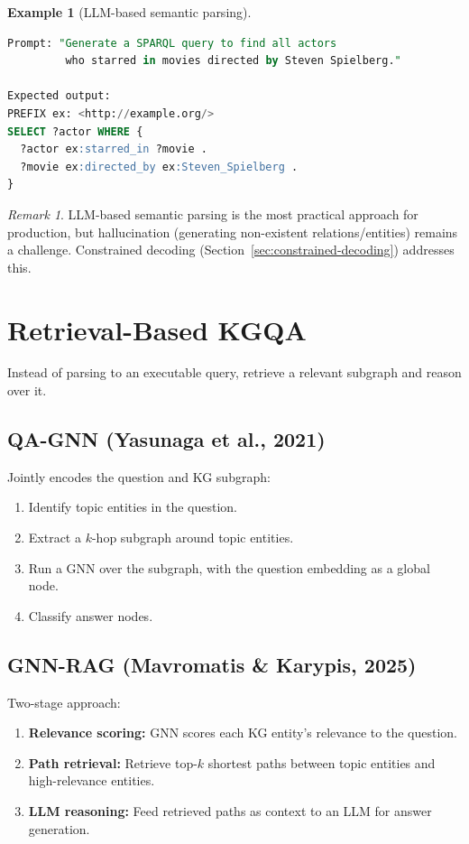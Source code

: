 \documentclass[11pt,a4paper,oneside,openany]{book}
\theoremstyle{definition}
\newtheorem{example}{Example}[chapter]
\theoremstyle{plain}
\theoremstyle{remark}
\newtheorem{remark}{Remark}[chapter]
\begin{document}
\begin{example}[LLM-based semantic parsing]
	\begin{lstlisting}[language=SQL,numbers=none]
Prompt: "Generate a SPARQL query to find all actors
         who starred in movies directed by Steven Spielberg."

Expected output:
PREFIX ex: <http://example.org/>
SELECT ?actor WHERE {
  ?actor ex:starred_in ?movie .
  ?movie ex:directed_by ex:Steven_Spielberg .
}
\end{lstlisting}
\end{example}

\begin{remark}
	LLM-based semantic parsing is the most practical approach for production, but hallucination (generating non-existent relations/entities) remains a challenge. Constrained decoding (Section~\ref{sec:constrained-decoding}) addresses this.
\end{remark}

\section{Retrieval-Based KGQA}\label{sec:retrieval-kgqa}

Instead of parsing to an executable query, retrieve a relevant subgraph and reason over it.

\subsection{QA-GNN (Yasunaga et al., 2021)}

Jointly encodes the question and KG subgraph:
\begin{enumerate}
	\item Identify topic entities in the question.
	\item Extract a $k$-hop subgraph around topic entities.
	\item Run a GNN over the subgraph, with the question embedding as a global node.
	\item Classify answer nodes.
\end{enumerate}

\subsection{GNN-RAG (Mavromatis \& Karypis, 2025)}

Two-stage approach:
\begin{enumerate}
	\item \textbf{Relevance scoring:} GNN scores each KG entity's relevance to the question.
	\item \textbf{Path retrieval:} Retrieve top-$k$ shortest paths between topic entities and high-relevance entities.
	\item \textbf{LLM reasoning:} Feed retrieved paths as context to an LLM for answer generation.
\end{enumerate}
\end{document}
